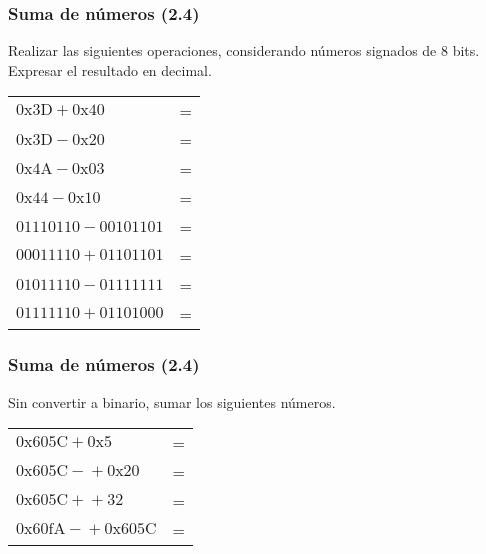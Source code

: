 \subsubsection{Suma de números (2.4)}
Realizar las siguientes operaciones, considerando números signados de 8 bits. Expresar el resultado en decimal.
\vspace{10mm}

\begin{tabular}{lc}
  $\mathrm{0x3D} + \mathrm{0x40} $&=\underspace\\
  $\mathrm{0x3D} - \mathrm{0x20} $&=\underspace\\
  $\mathrm{0x4A} - \mathrm{0x03} $&=\underspace\\
  $\mathrm{0x44} - \mathrm{0x10} $&=\underspace\\
  $\mathrm{01110110} - \mathrm{00101101}$&=\underspace\\
  $\mathrm{00011110} + \mathrm{01101101}$&=\underspace\\
  $\mathrm{01011110} - \mathrm{01111111}$&=\underspace\\
  $\mathrm{01111110} + \mathrm{01101000}$&=\underspace\\

\end{tabular}

\subsubsection{Suma de números (2.4)}
Sin convertir a binario, sumar los siguientes números.

\begin{tabular}{lc}
  $\mathrm{0x605C} + \mathrm{0x5} $&=\underspace\\
  $\mathrm{0x605C -} + \mathrm{0x20} $&=\underspace\\
  $\mathrm{0x605C +} + \mathrm{32} $&=\underspace\\
  $\mathrm{0x60fA -} + \mathrm{0x605C} $&=\underspace\\
\end{tabular}

